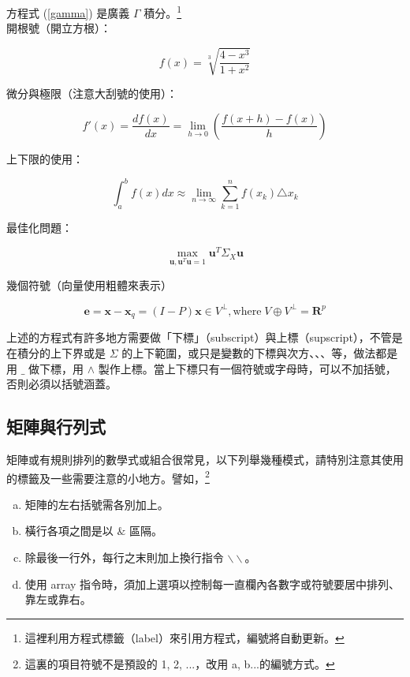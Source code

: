 方程式  (\ref{gamma}) 是廣義 $\Gamma$ 積分。\footnote{這裡利用方程式標籤（label）來引用方程式，編號將自動更新。}\\
  
 開根號（開立方根）：
  
  $$f(x)=\sqrt[3]{\frac {\displaystyle 4-x^{3}}{\displaystyle 1+x^{2}}}$$
  
 微分與極限（注意大刮號的使用）：
  
  $$f'(x)=\frac{df(x)}{dx}=\lim_{h\rightarrow 0}\left(\frac{f(x+h)-f(x)}{h}\right)$$
  
  上下限的使用：
  
  $$\int_a^b f(x) dx \approx \lim_{n\rightarrow \infty}\sum_{k=1}^n f(x_k)\triangle x_k$$
  
  最佳化問題：
  
  $$\max_{\mathbf{u},\mathbf{u}^T\mathbf{u}=1} \mathbf{u}^T\Sigma_X\mathbf{u}$$
  
  幾個符號（向量使用粗體來表示）

  $$\mathbf{e}=\mathbf{x}-\mathbf{x}_q=(I-P)\mathbf{x} \in V^{\perp}, \mbox{where}\; V\oplus V^{\perp}=\mathbf{R}^p $$

 上述的方程式有許多地方需要做「下標」（subscript）與上標（supscript），不管是在積分的上下界或是 $\Sigma$ 的上下範圍，或只是變數的下標與次方、、、等，做法都是用  $\_$ 做下標，用 $\wedge$ 製作上標。當上下標只有一個符號或字母時，可以不加括號，否則必須以括號涵蓋。
 
\subsection{矩陣與行列式}
矩陣或有規則排列的數學式或組合很常見，以下列舉幾種模式，請特別注意其使用的標籤及一些需要注意的小地方。譬如，\footnote{這裏的項目符號不是預設的 1, 2, ...，改用 a, b...的編號方式。}
\begin{enumerate}[a)]
  \item 矩陣的左右括號需各別加上。
  \item 橫行各項之間是以 $\&$ 區隔。
  \item 除最後一行外，每行之末則加上換行指令 $\backslash\backslash$。
  \item 使用 {\A array} 指令時，須加上選項以控制每一直欄內各數字或符號要居中排列、靠左或靠右。
\end{enumerate}

